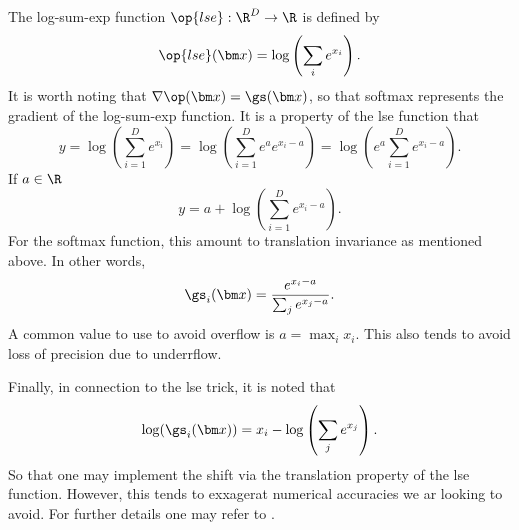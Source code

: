  The log-sum-exp function \(\op{lse}:\R^D\rightarrow\R\) is defined by 
 \[\op{lse}(\bm x) = \log\left(\sum_i e^{x_i}\right).\]
 It is worth noting that \(\nabla\op(\bm x) = \gs(\bm x)\), so that softmax 
 represents the gradient of the log-sum-exp function.  It is a property of the 
 lse function that 
 \[y = \log\left(\sum_{i=1}^{D} e^{x_i}\right) = \log\left(\sum_{i=1}^{D} e^a
 e^{x_i-a}\right) = \log\left(e^a\sum_{i=1}^{D} e^{x_i-a}\right).\]
 If \(a\in\R\)
 \[y = a + \log\left(\sum_{i=1}^{D} e^{x_i-a}\right).\]
 For the softmax function, this amount to translation invariance as mentioned 
 above.  In other words,
\[\gs_i(\bm x) = \frac{e^{x_i-a}}{\sum_{j} e^{x_j-a}}.\]
A common value to use to avoid overflow is \(a =\max_i x_i\). This also tends 
to avoid loss of precision due to underrflow.

Finally, in connection to the lse trick, it is noted that 
\[\log(\gs_i(\bm x)) = x_i - \log\left(\sum_j e^{x_j}\right).\]
So that one may implement the shift via the translation property of the lse 
function.  However, this tends to exxagerat numerical accuracies we ar looking 
to avoid. For further details one may refer to \cite{AccurateSoftmax}.